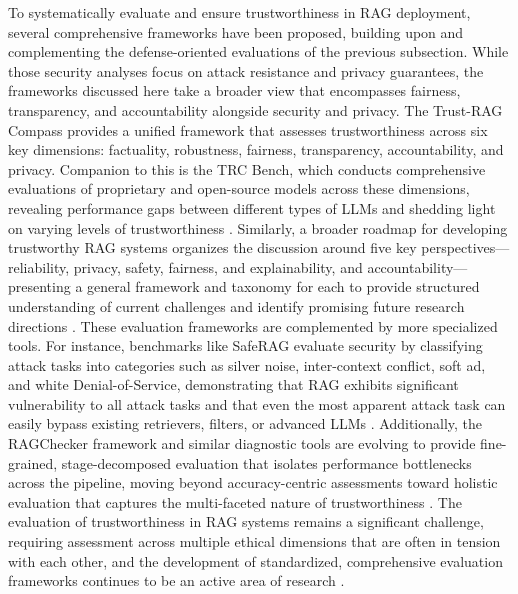 \documentclass[11pt]{article}
\begin{document}
To systematically evaluate and ensure trustworthiness in RAG deployment, several comprehensive frameworks have been proposed, building upon and complementing the defense-oriented evaluations of the previous subsection. While those security analyses focus on attack resistance and privacy guarantees, the frameworks discussed here take a broader view that encompasses fairness, transparency, and accountability alongside security and privacy. The Trust-RAG Compass provides a unified framework that assesses trustworthiness across six key dimensions: factuality, robustness, fairness, transparency, accountability, and privacy. Companion to this is the TRC Bench, which conducts comprehensive evaluations of proprietary and open-source models across these dimensions, revealing performance gaps between different types of LLMs and shedding light on varying levels of trustworthiness \cite{ref77}. Similarly, a broader roadmap for developing trustworthy RAG systems organizes the discussion around five key perspectives---reliability, privacy, safety, fairness, and explainability, and accountability---presenting a general framework and taxonomy for each to provide structured understanding of current challenges and identify promising future research directions \cite{ref507}. These evaluation frameworks are complemented by more specialized tools. For instance, benchmarks like SafeRAG evaluate security by classifying attack tasks into categories such as silver noise, inter-context conflict, soft ad, and white Denial-of-Service, demonstrating that RAG exhibits significant vulnerability to all attack tasks and that even the most apparent attack task can easily bypass existing retrievers, filters, or advanced LLMs \cite{ref508}. Additionally, the RAGChecker framework and similar diagnostic tools are evolving to provide fine-grained, stage-decomposed evaluation that isolates performance bottlenecks across the pipeline, moving beyond accuracy-centric assessments toward holistic evaluation that captures the multi-faceted nature of trustworthiness \cite{ref77}. The evaluation of trustworthiness in RAG systems remains a significant challenge, requiring assessment across multiple ethical dimensions that are often in tension with each other, and the development of standardized, comprehensive evaluation frameworks continues to be an active area of research \cite{ref507}.
\end{document}

